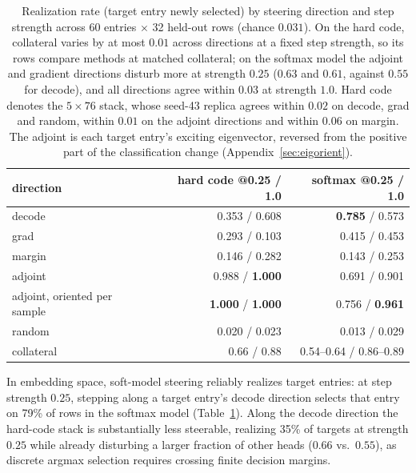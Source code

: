 \begin{table}[htbp]\centering\small
\begin{tabular}{@{}lrr@{}}
\toprule
direction & hard code @0.25 / 1.0 & softmax @0.25 / 1.0 \\
\midrule
decode                       & 0.353 / 0.608 & \textbf{0.785} / 0.573 \\
grad                         & 0.293 / 0.103 & 0.415 / 0.453 \\
margin                       & 0.146 / 0.282 & 0.143 / 0.253 \\
adjoint                      & 0.988 / \textbf{1.000} & 0.691 / 0.901 \\
adjoint, oriented per sample & \textbf{1.000} / \textbf{1.000} & 0.756 / \textbf{0.961} \\
random                       & 0.020 / 0.023 & 0.013 / 0.029 \\
\midrule
collateral                   & 0.66 / 0.88   & 0.54--0.64 / 0.86--0.89 \\
\bottomrule
\end{tabular}
\caption{Realization rate (target entry newly selected) by steering
direction and step strength across 60 entries $\times$ 32 held-out rows
(chance $0.031$). On the hard code, collateral varies by at most $0.01$
across directions at a fixed step strength, so its rows compare methods at
matched collateral; on the softmax model the adjoint and gradient directions
disturb more at strength $0.25$ ($0.63$ and $0.61$, against $0.55$ for
decode), and all directions agree within $0.03$ at strength $1.0$. Hard code
denotes the $5\times76$ stack, whose seed-43 replica agrees within $0.02$ on
decode, grad and random, within $0.01$ on the adjoint directions and within
$0.06$ on margin. The adjoint is each target entry's exciting eigenvector,
reversed from the positive part of the classification change
(Appendix~\ref{sec:eigorient}).}
\label{tab:steerembed}
\end{table}

In embedding space, soft-model steering reliably realizes target entries: at
step strength $0.25$, stepping along a target entry's decode direction
selects that entry on 79\% of rows in the softmax model
(Table~\ref{tab:steerembed}). Along the decode direction the hard-code stack
is substantially less steerable, realizing 35\% of targets at strength $0.25$ while already
disturbing a larger fraction of other heads ($0.66$ vs.\ $0.55$), as discrete
argmax selection requires crossing finite decision margins.

